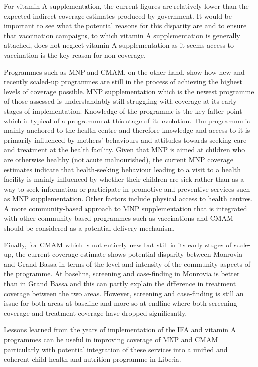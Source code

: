 \documentclass[12pt,a4paper]{article}
\begin{document}
For vitamin A supplementation, the current figures are relatively lower than the expected indirect coverage estimates produced by government. It would be important to see what the potential reasons for this disparity are and to ensure that vaccination campaigns, to which vitamin A supplementation is generally attached, does not neglect vitamin A supplementation as it seems access to vaccination is the key reason for non-coverage.

Programmes such as MNP and CMAM, on the other hand, show how new and recently scaled-up programmes are still in the process of achieving the highest levels of coverage possible. MNP supplementation which is the newest programme of those assessed is understandably still struggling with coverage at its early stages of implementation. Knowledge of the programme is the key falter point which is typical of a programme at this stage of its evolution. The programme is mainly anchored to the health centre and therefore knowledge and access to it is primarily influenced by mothers' behaviours and attitudes towards seeking care and treatment at the health facility. Given that MNP is aimed at children who are otherwise healthy (not acute malnourished), the current MNP coverage estimates indicate that health-seeking behaviour leading to a visit to a health facility is mainly influenced by whether their children are sick rather than as a way to seek information or participate in promotive and preventive services such as MNP supplementation. Other factors include physical access to health centres. A more community-based approach to MNP supplementation that is integrated with other community-based programmes such as vaccinations and CMAM should be considered as a potential delivery mechanism.

Finally, for CMAM which is not entirely new but still in its early stages of scale-up, the current coverage estimate shows potential disparity between Monrovia and Grand Bassa in terms of the level and intensity of the community aspects of the programme. At baseline, screening and case-finding in Monrovia is better than in Grand Bassa and this can partly explain the difference in treatment coverage between the two areas. However, screening and case-finding is still an issue for both areas at baseline and more so at endline where both screening coverage and treatment coverage have dropped significantly.

Lessons learned from the years of implementation of the IFA and vitamin A programmes can be useful in improving coverage of MNP and CMAM particularly with potential integration of these services into a unified and coherent child health and nutrition programme in Liberia.

\renewcommand\refname{References}

\end{document}
